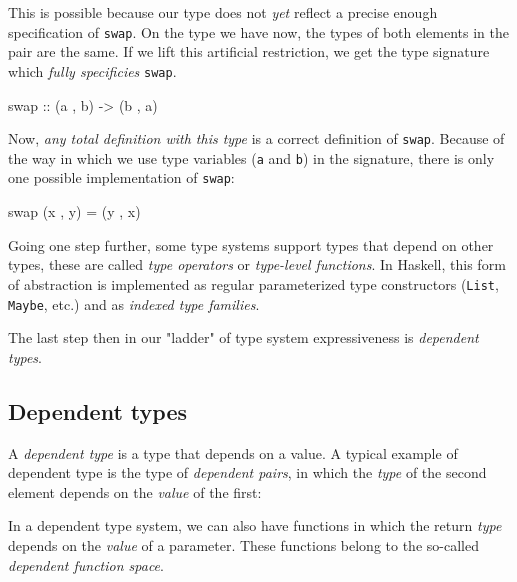             This is possible because our type does not \emph{yet} reflect a precise enough specification of \texttt{swap}.
            On the type we have now, the types of both elements in the pair are the same.
            If we lift this artificial restriction, we get the type signature which \emph{fully specificies} \texttt{swap}.
            \begin{haskellcode}
        swap :: (a , b) -> (b , a)
            \end{haskellcode}

            Now, \emph{any total definition with this type} is a correct definition of \texttt{swap}.
            Because of the way in which we use type variables (\texttt{a} and \texttt{b}) in the signature,
            there is only one possible implementation of \texttt{swap}:
            \begin{haskellcode}
        swap (x , y) = (y , x)
            \end{haskellcode}

            Going one step further, some type systems support types that depend on other types, these are
            called \emph{type operators} or \emph{type-level functions}.
            In Haskell, this form of abstraction is implemented as regular parameterized type constructors
            (\texttt{List}, \texttt{Maybe}, etc.) and as \emph{indexed type families}.

            The last step then in our "ladder" of type system expressiveness is \emph{dependent types}.

        \subsection{Dependent types}
        \label{subsec:dependent-types}

            A \emph{dependent type} is a type that depends on a value.
            A typical example of dependent type is the type of \emph{dependent pairs},
            in which the \emph{type} of the second element depends on the \emph{value} of the first:

            \begin{center}
            \end{center}

            In a dependent type system, we can also have functions in which the return \emph{type}
            depends on the \emph{value} of a parameter.
            These functions belong to the so-called \emph{dependent function space}.


